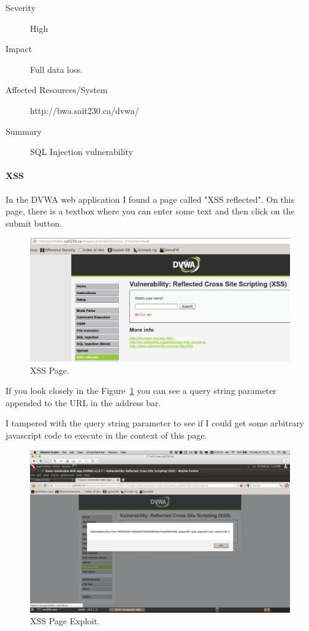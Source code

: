 \documentclass{article}
\begin{document}
\begin{description}
  \item[Severity] High
  \item[Impact] Full data loss.
  \item[Affected Resources/System] http://bwa.sait230.ca/dvwa/
  \item[Summary] SQL Injection vulnerability
\end{description}

\paragraph{XSS}
In the DVWA web application I found a page called "XSS reflected". 
On this page, there is a textbox where you can enter some text and then 
click on the submit button.

\begin{figure}[h!]
	\includegraphics[width=\linewidth]{images/dvwa-xss-page.png}
	\caption{XSS Page.}
	\label{fig:xss-page1}
\end{figure}

If you look closely in the Figure~\ref{fig:xss-page1} you can see a 
query string parameter appended to the URL in the address bar.

\newpage
I tampered with the query string parameter to see if I could get
some arbitrary javascript code to execute in the context of this
page.

\begin{figure}[h!]
	\includegraphics[width=\linewidth]{images/dvwa-xss-page-exploit.png}
	\caption{XSS Page Exploit.}
	\label{fig:xss-page2}
\end{figure}
\end{document}
